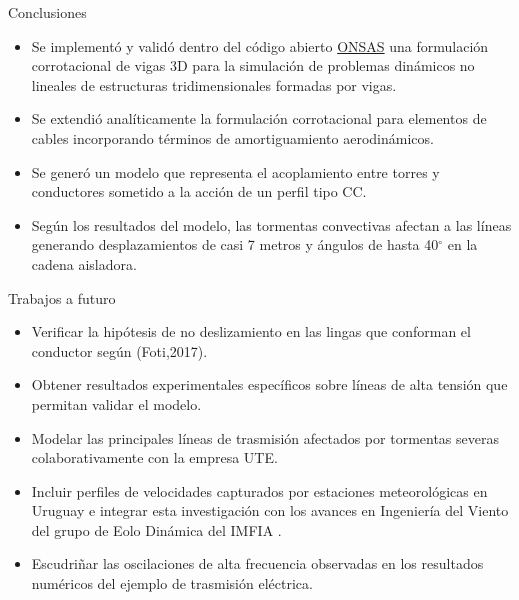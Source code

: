 \documentclass[
  aspectratio=169,
]{beamer}
\begin{document}
\begin{small}
\begin{frame}{Conclusiones }
	\begin{itemize}
		\item  Se implementó y validó dentro del código abierto \href{https://github.com/ONSAS/ONSAS.m/}{ONSAS} una formulación corrotacional de vigas 3D para la simulación de problemas dinámicos no lineales de estructuras tridimensionales formadas por vigas.
		\pause 
		\item Se extendió analíticamente la formulación corrotacional para elementos de cables incorporando términos de amortiguamiento aerodinámicos.
		\pause
		\item Se generó un modelo que representa el acoplamiento entre torres y conductores sometido a la acción de un perfil tipo CC.
		\pause
		\item Según los resultados del modelo, las tormentas convectivas afectan a las líneas generando desplazamientos de casi 7 metros y ángulos de hasta 40$^{\circ}$ en la cadena aisladora. 
	\end{itemize}
\end{frame}
\begin{frame}{Trabajos a futuro }
	\begin{itemize}
		\item Verificar la hipótesis de no deslizamiento en las lingas que conforman el conductor según {\color{blue}(Foti,2017)}.
		\pause
		\item Obtener resultados experimentales específicos sobre líneas de alta tensión que permitan validar el modelo. 
		\pause
		\item Modelar las principales líneas de trasmisión afectados por tormentas severas colaborativamente con la empresa UTE.
		\pause
		\item Incluir perfiles de velocidades capturados por estaciones meteorológicas en Uruguay e integrar esta investigación con los avances en Ingeniería del Viento del grupo de Eolo Dinámica del IMFIA . 
		\pause 
		\item  Escudriñar  las oscilaciones de alta frecuencia observadas en los resultados numéricos del ejemplo de trasmisión eléctrica.

\end{itemize}
\end{frame}
\end{small}
\end{document}
